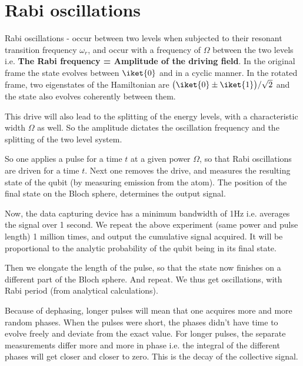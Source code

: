 \section{Rabi oscillations}
 Rabi oscillations - occur between two levels when subjected to their resonant transition frequency $ \omega_r $, and occur with a frequency of $ \Omega $ between the two levels i.e. \textbf{The Rabi frequency = Amplitude of the driving field}. In the original frame the state evolves between $ \iket{0} $ and  in a cyclic manner. In the rotated frame, two eigenstates of the Hamiltonian are $ \big(\iket{0}\pm\iket{1}\big)/\sqrt{2} $ and the state also evolves coherently between them.
 
 This drive will also lead to the splitting of the energy levels, with a characteristic width $ \Omega $ as well. So the amplitude dictates the oscillation frequency and the splitting of the two level system.
 
 So one applies a pulse for a time $ t $ at a given power $ \Omega $, so that Rabi oscillations are driven for a time $ t $. Next one removes the drive, and measures the resulting state of the qubit (by measuring emission from the atom). The position of the final state on the Bloch sphere, determines the output signal. 
 
 Now, the data capturing device has a minimum bandwidth of 1Hz i.e. averages the signal over 1 second. We repeat the above experiment (same power and pulse length) 1 million times, and output the cumulative signal acquired. It will be proportional to the analytic probability of the qubit being in its final state.
 
 Then we elongate the length of the pulse, so that the state now finishes on a different part of the Bloch sphere. And repeat. We thus get oscillations, with Rabi period (from analytical calculations).
 
 Because of dephasing, longer pulses will mean that one acquires more and more random phases. When the pulses were short, the phases didn't have time to evolve freely and deviate from the exact value. For longer pulses, the separate measurements differ more and more in phase i.e. the integral of the different phases will get closer and closer to zero. This is the decay of the collective signal.
 
\newpage